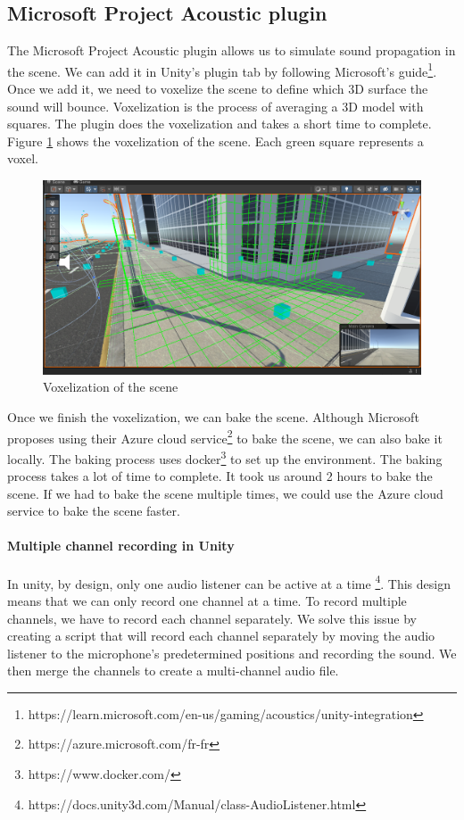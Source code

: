 \subsection{Microsoft Project Acoustic plugin}

The Microsoft Project Acoustic plugin allows us to simulate sound propagation in the scene. We can add it in Unity's plugin tab by following Microsoft's guide\footnote{https://learn.microsoft.com/en-us/gaming/acoustics/unity-integration}. Once we add it, we need to voxelize the scene to define which 3D surface the sound will bounce. Voxelization is the process of averaging a 3D model with squares. The plugin does the voxelization and takes a short time to complete. Figure \ref{fig:simulation_voxelization} shows the voxelization of the scene. Each green square represents a voxel.

\begin{figure}[H]
    \centering
    \includegraphics[width=.8\textwidth]{images/simulation_voxelization.png}
    \caption{Voxelization of the scene}
    \label{fig:simulation_voxelization}
\end{figure}

Once we finish the voxelization, we can bake the scene. Although Microsoft proposes using their Azure cloud service\footnote{https://azure.microsoft.com/fr-fr} to bake the scene, we can also bake it locally. The baking process uses docker\footnote{https://www.docker.com/} to set up the environment. The baking process takes a lot of time to complete. It took us around 2 hours to bake the scene. If we had to bake the scene multiple times, we could use the Azure cloud service to bake the scene faster.

\paragraph{Multiple channel recording in Unity}

In unity, by design, only one audio listener can be active at a time \footnote{https://docs.unity3d.com/Manual/class-AudioListener.html}. This design means that we can only record one channel at a time. To record multiple channels, we have to record each channel separately. We solve this issue by creating a script that will record each channel separately by moving the audio listener to the microphone's predetermined positions and recording the sound. We then merge the channels to create a multi-channel audio file.

